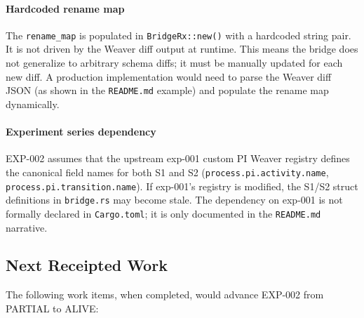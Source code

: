 \paragraph{Hardcoded rename map}
The \texttt{rename\_map} is populated in \texttt{BridgeRx::new()} with a
hardcoded string pair. It is not driven by the Weaver diff output at runtime.
This means the bridge does not generalize to arbitrary schema diffs; it must be
manually updated for each new diff. A production implementation would need to
parse the Weaver diff JSON (as shown in the \texttt{README.md} example) and
populate the rename map dynamically.

\paragraph{Experiment series dependency}
EXP-002 assumes that the upstream exp-001 custom PI Weaver registry defines the
canonical field names for both S1 and S2 (\texttt{process.pi.activity.name},
\texttt{process.pi.transition.name}). If exp-001's registry is modified, the S1/S2
struct definitions in \texttt{bridge.rs} may become stale. The dependency on
exp-001 is not formally declared in \texttt{Cargo.toml}; it is only documented
in the \texttt{README.md} narrative.

\subsection{Next Receipted Work}
\label{sec:otel-weaver-exp-002-diff-to-residual-open-next}

The following work items, when completed, would advance EXP-002 from PARTIAL to ALIVE:

